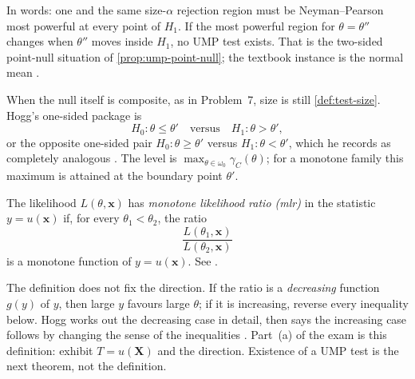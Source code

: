\documentclass[11pt,a4paper]{article}
\begin{document}
In words: one and the same size-\(\alpha\) rejection region must be Neyman--Pearson most powerful at every point of \(H_1\). If the most powerful region for \(\theta=\theta''\) changes when \(\theta''\) moves inside \(H_1\), no UMP test exists. That is the two-sided point-null situation of \cref{prop:ump-point-null}; the textbook instance is the normal mean \citep[Example~8.2.3]{hogg2019}.

When the null itself is composite, as in Problem~7, size is still \cref{def:test-size}. Hogg's one-sided package is
\[
H_0:\theta\le\theta'
\quad\text{versus}\quad
H_1:\theta>\theta',
\]
or the opposite one-sided pair \(H_0:\theta\ge\theta'\) versus \(H_1:\theta<\theta'\), which he records as completely analogous \citep[(8.2.1), (8.2.6)]{hogg2019}. The level is \(\max_{\theta\in\omega_0}\gamma_C(\theta)\); for a monotone family this maximum is attained at the boundary point \(\theta'\).

\begin{definition}
\label{def:mlr}
The likelihood \(L(\theta,\mathbf{x})\) has \emph{monotone likelihood ratio (mlr)} in the statistic \(y=u(\mathbf{x})\) if, for every \(\theta_1<\theta_2\), the ratio
\[
\frac{L(\theta_1,\mathbf{x})}{L(\theta_2,\mathbf{x})}
\]
is a monotone function of \(y=u(\mathbf{x})\). See \citep[Definition~8.2.2]{hogg2019}.
\end{definition}

The definition does not fix the direction. If the ratio is a \emph{decreasing} function \(g(y)\) of \(y\), then large \(y\) favours large \(\theta\); if it is increasing, reverse every inequality below. Hogg works out the decreasing case in detail, then says the increasing case follows by changing the sense of the inequalities \citep[after Definition~8.2.2]{hogg2019}. Part~(a) of the exam is this definition: exhibit \(T=u(\mathbf{X})\) and the direction. Existence of a UMP test is the next theorem, not the definition.
\end{document}
